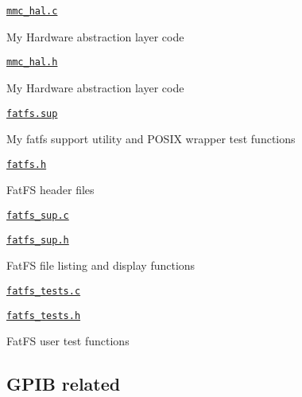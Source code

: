 \begin{DoxyItemize}
\begin{DoxyItemize}
\item \href{fatfs.hal/mmc_hal.c}{\tt mmc\+\_\+hal.\+c}
\begin{DoxyItemize}
\item My Hardware abstraction layer code
\end{DoxyItemize}
\item \href{fatfs.hal/mmc_hal.h}{\tt mmc\+\_\+hal.\+h}
\begin{DoxyItemize}
\item My Hardware abstraction layer code
\end{DoxyItemize}
\end{DoxyItemize}
\item \href{fatfs.sup/fatfs.sup}{\tt fatfs.\+sup}
\begin{DoxyItemize}
\item My fatfs support utility and P\+O\+S\+IX wrapper test functions
\item \href{fatfs.sup/fatfs.h}{\tt fatfs.\+h}
\begin{DoxyItemize}
\item Fat\+FS header files
\end{DoxyItemize}
\item \href{fatfs.sup/fatfs_sup.c}{\tt fatfs\+\_\+sup.\+c}
\item \href{fatfs.sup/fatfs_sup.h}{\tt fatfs\+\_\+sup.\+h}
\begin{DoxyItemize}
\item Fat\+FS file listing and display functions
\end{DoxyItemize}
\item \href{fatfs.sup/fatfs_tests.c}{\tt fatfs\+\_\+tests.\+c}
\item \href{fatfs.sup/fatfs_tests.h}{\tt fatfs\+\_\+tests.\+h}
\begin{DoxyItemize}
\item Fat\+FS user test functions
\end{DoxyItemize}
\end{DoxyItemize}
\end{DoxyItemize}

\subsection*{G\+P\+IB related}



